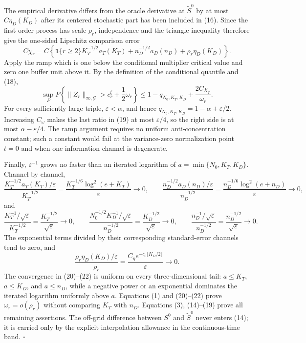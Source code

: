 The empirical derivative differs from the oracle derivative at
\(\widetilde S^0\) by at most \(C\eta_D(K_D)\) after its centered stochastic
part has been included in (16).  Since the first-order process has scale
\(\rho_r\), independence and the triangle inequality therefore give the
one-sided Lipschitz comparison error
\[
 C\chi_r=C\left\{\mathbf 1\{r\ge2\}K_T^{-1/2}a_T(K_T)
 +n_D^{-1/2}a_D(n_D)+\rho_r\eta_D(K_D)\right\}.              \tag{18}
\]
Apply the ramp which is one below the conditional multiplier critical
value and zero one buffer unit above it.  By the definition of the
conditional quantile and (18),
\[
 \sup_P P\!\left\{\|Z_r\|_{\infty,\mathcal G}>
 c_r^\xi+\frac12\omega_r\right\}
 \le1-q_{N_0,K_T,K_D}+\frac{2C\chi_r}{\omega_r}.             \tag{19}
\]
For every sufficiently large triple, \(\varepsilon<\alpha\), and hence
\(q_{N_0,K_T,K_D}=1-\alpha+\varepsilon/2\).  Increasing \(C_\omega\)
makes the last ratio in (19) at most \(\varepsilon/4\), so the right side
is at most \(\alpha-\varepsilon/4\).  The ramp argument requires no uniform
anti-concentration constant; such a constant would fail at the
variance-zero normalization point \(t=0\) and when one information channel
is degenerate.

Finally, \(\varepsilon^{-1}\) grows no faster than an iterated logarithm of
\(a=\min\{N_0,K_T,K_D\}\).  Channel by channel,
\[
 \frac{K_T^{-1/2}a_T(K_T)/\varepsilon}{K_T^{-1/2}}
 =\frac{K_T^{-1/6}\log^2(e+K_T)}{\varepsilon}\to0,
 \qquad
 \frac{n_D^{-1/2}a_D(n_D)/\varepsilon}{n_D^{-1/2}}
 =\frac{n_D^{-1/6}\log^2(e+n_D)}{\varepsilon}\to0,          \tag{20}
\]
and
\[
 \frac{K_T^{-1}/\sqrt\varepsilon}{K_T^{-1/2}}
 =\frac{K_T^{-1/2}}{\sqrt\varepsilon}\to0,
 \qquad
 \frac{N_0^{-1/2}K_D^{-1}/\sqrt\varepsilon}{n_D^{-1/2}}
 =\frac{K_D^{-1/2}}{\sqrt\varepsilon}\to0,
 \qquad
 \frac{n_D^{-1}/\sqrt\varepsilon}{n_D^{-1/2}}
 =\frac{n_D^{-1/2}}{\sqrt\varepsilon}\to0.                 \tag{21}
\]
The exponential terms divided by their corresponding standard-error
channels tend to zero, and
\[
 \frac{\rho_r\eta_D(K_D)/\varepsilon}{\rho_r}
 =\frac{C_\eta e^{-c_0\lfloor K_D/2\rfloor}}{\varepsilon}
 \to0.                                                       \tag{22}
\]
The convergence in (20)--(22) is uniform on every three-dimensional tail:
\(a\le K_T\), \(a\le K_D\), and \(a\le n_D\), while a negative power or an
exponential dominates the iterated logarithm uniformly above \(a\).
Equations (1) and (20)--(22) prove \(\omega_r=o(\rho_r)\) without comparing
\(K_T\) with \(n_D\).  Equations (3), (14)--(19) prove all remaining
assertions.  The off-grid difference between \(S^0\) and
\(\widetilde S^0\) never enters (14); it is carried only by the explicit
interpolation allowance in the continuous-time band. \(\square\)